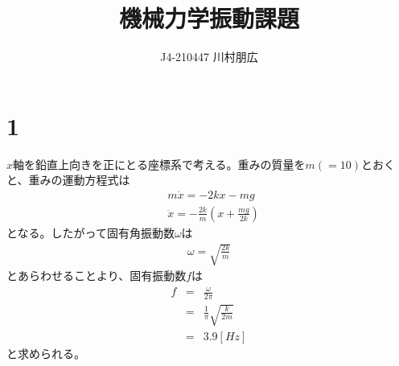 \documentclass[pdflatex,ja=standard,fleqn]{bxjsarticle}
\title{機械力学振動課題}
\author{J4-210447 川村朋広}
\begin{document}
\maketitle

\section*{1}
$x$軸を鉛直上向きを正にとる座標系で考える。重みの質量を$m(=10)$とおくと、重みの運動方程式は
\begin{align*}
    &m\ddot{x}=-2kx-mg\\
    &\ddot{x}=-\frac{2k}{m}\left(x+\frac{mg}{2k}\right)
\end{align*}
となる。したがって固有角振動数$\omega$は
\begin{eqnarray*}
    \omega=\sqrt{\frac{2k}{m}}
\end{eqnarray*}
とあらわせることより、固有振動数$f$は
\begin{eqnarray*}
    f&=&\frac{\omega}{2\pi}\\
    &=&\frac{1}{\pi}\sqrt{\frac{k}{2m}}\\
    &=&3.9[Hz]
\end{eqnarray*}
と求められる。
\end{document}
